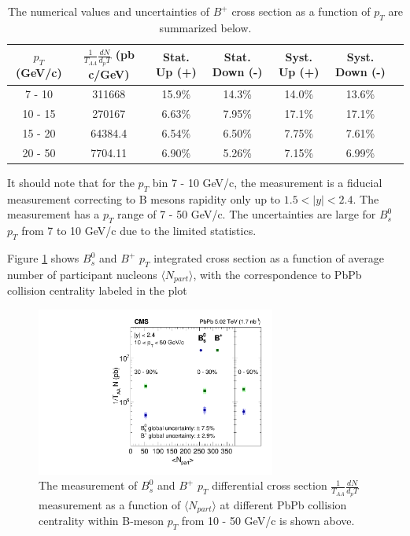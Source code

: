 \begin{table}[h]
\begin{center}
\caption{The numerical values and uncertainties of $B^+$ cross section as a function of $p_T$ are summarized below.}
\vspace{1em}
\label{BPXsectPt}
  \begin{tabular}{| c | c |c | c| c| c| c|}
    \hline
$p_T$ (GeV/c) &  $\frac{1}{T_{AA}} \frac{dN}{d_pT}$ (pb c/GeV) & Stat. Up (+)   & Stat. Down (-)  &  Syst. Up (+)  &  Syst. Down (-) \\
    \hline
    \hline
 7 - 10 &   311668  &  15.9\% & 14.3\% & 14.0\% & 13.6\% \\ 
 10 - 15 & 270167  & 6.63\%  & 7.95\%  & 17.1\% & 17.1\% \\ 
 15 - 20 &  64384.4 & 6.54\%   &  6.50\% & 7.75\% & 7.61\% \\ 
 20 - 50 &  7704.11    & 6.90\%  &  5.26\% & 7.15\% &6.99\% \\ 
    \hline
    \hline
\end{tabular}
\end{center}
\end{table}

It should note that for the $p_T$ bin 7 - 10 GeV/c, the measurement is a fiducial measurement correcting to B mesons rapidity only up to $1.5 < |y| < 2.4$. The measurement has a $p_T$ range of 7 - 50 GeV/c. The uncertainties are large for $B^0_s$ $p_T$ from 7 to 10 GeV/c due to the limited statistics. 



Figure \ref{BmesonDataCent} shows $B^0_s$ and $B^+$ $p_T$ integrated cross section as a function of average number of participant nucleons $\langle N_{part}\rangle$, with the correspondence to PbPb collision centrality labeled in the plot
 

\begin{figure}[hbtp]
\begin{center}
\includegraphics[width=0.70\textwidth]{Figures/Chapter5/xsec_vsCent.pdf}
\caption{The measurement of $B^0_s$ and $B^+$ $p_T$ differential cross section $\frac{1}{T_{AA}} \frac{dN}{d_pT}$ measurement as a function of $\langle N_{part}\rangle$ at different PbPb collision centrality within B-meson $p_T$ from 10 - 50 GeV/c is shown above. }
\label{BmesonDataCent}
\end{center}
\end{figure}

